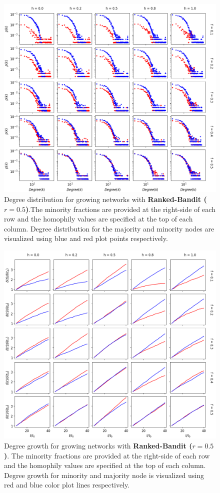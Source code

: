 \begin{appendices}
\begin{figure}[h!]
	\centering
	\includegraphics[width=1.0\textwidth]{images/dd_growth_rb05.png}
	\caption{Degree distribution for growing networks with \textbf{Ranked-Bandit ($r = 0.5$)}.The minority fractions are provided at the right-side of each row and the homophily values are specified at the top of each column. Degree distribution for the majority and minority nodes are visualized using blue and red plot points respectively.}
	\label{dd_growth_rb05_fig}
\end{figure}

\begin{figure}[h!]
	\centering
	\includegraphics[width=1.0\textwidth]{images/dg_growth_rb05.png}
	\caption{Degree growth for growing networks with \textbf{Ranked-Bandit ($r = 0.5$)}. The minority fractions are provided at the right-side of each row and the homophily values are specified at the top of each column. Degree growth for minority and majority node is visualized using red and blue color plot lines respectively.}
	\label{dg_growth_rb05_fig}
\end{figure}


\end{appendices}
